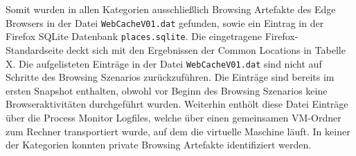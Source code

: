 Somit wurden in allen Kategorien ausschließlich Browsing Artefakte des Edge Browsers in der Datei \texttt{WebCacheV01.dat} gefunden, sowie ein Eintrag in der Firefox SQLite Datenbank \texttt{places.sqlite}. Die eingetragene Firefox-Standardseite deckt sich mit den Ergebnissen der Common Locations in Tabelle X. Die aufgelisteten Einträge in der Datei \texttt{WebCacheV01.dat} sind nicht auf Schritte des Browsing Szenarios zurückzuführen. Die Einträge sind bereits im ersten Snapshot enthalten, obwohl vor Beginn des Browsing Szenarios keine Browseraktivitäten durchgeführt wurden. Weiterhin enthölt diese Datei Einträge über die Process Monitor Logfiles, welche über einen gemeinsamen VM-Ordner zum Rechner transportiert wurde, auf dem die virtuelle Maschine läuft.
In keiner der Kategorien konnten private Browsing Artefakte identifiziert werden.


